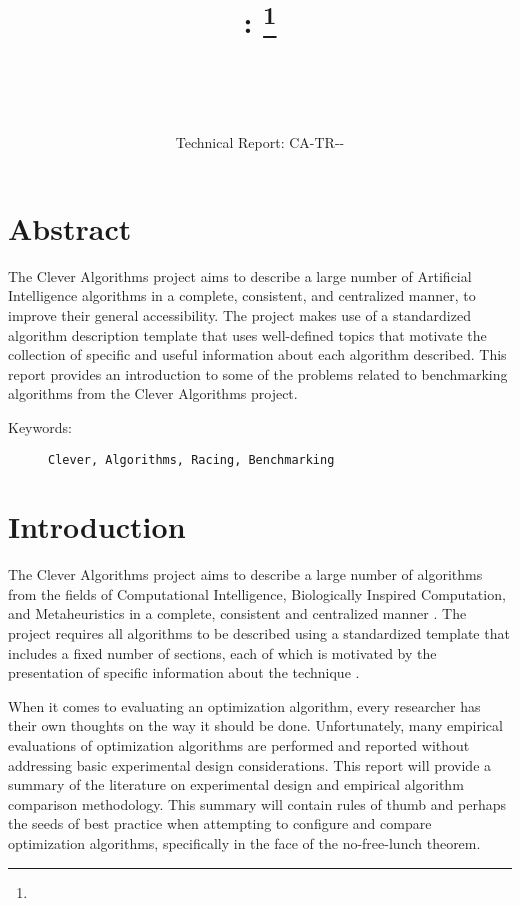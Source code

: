 \documentclass[a4paper, 11pt]{article}
\title{{\myreporttitle}: {\myreportsubtitle}\footnote{\myreportlicense}}
\author{\myreportauthor\\{\myreportemail}\\\small\myreportproject}
\date{\myreportfulldate\\{\small{Technical Report: CA-TR-{\myreportdate}-\myreportversion}}}
\begin{document}
\maketitle

\section*{Abstract} 
The Clever Algorithms project aims to describe a large number of Artificial Intelligence algorithms in a complete, consistent, and centralized manner, to improve their general accessibility. 
The project makes use of a standardized algorithm description template that uses well-defined topics that motivate the collection of specific and useful information about each algorithm described.
This report provides an introduction to some of the problems related to benchmarking algorithms from the Clever Algorithms project.

\begin{description}
	\item[Keywords:] {\small\texttt{Clever, Algorithms, Racing, Benchmarking}}
\end{description} 

\section{Introduction}
\label{sec:introduction}
The Clever Algorithms project aims to describe a large number of algorithms from the fields of Computational Intelligence, Biologically Inspired Computation, and Metaheuristics in a complete, consistent and centralized manner \cite{Brownlee2010}.
The project requires all algorithms to be described using a standardized template that includes a fixed number of sections, each of which is motivated by the presentation of specific information about the technique \cite{Brownlee2010a}.

When it comes to evaluating an optimization algorithm, every researcher has their own thoughts on the way it should be done. Unfortunately, many empirical evaluations of optimization algorithms are performed and reported without addressing basic experimental design considerations. This report will provide a summary of the literature on experimental design and empirical algorithm comparison methodology. This summary will contain rules of thumb and perhaps the seeds of best practice when attempting to configure and compare optimization algorithms, specifically in the face of the no-free-lunch theorem.
\end{document}
